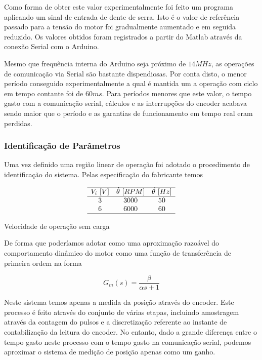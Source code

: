 \documentclass[a4paper,11pt]{article}
\begin{document}
Como forma de obter este valor experimentalmente foi feito um programa aplicando um sinal de entrada de dente de serra. Isto é o valor de referência passado para a tensão do motor foi gradualmente aumentado e em seguida reduzido. Os valores obtidos foram registrados a partir do Matlab através da conexão Serial com o Arduino.

Mesmo que frequência interna do Arduino seja próximo de $14 MHz$, as operações de comunicação via Serial são bastante dispendiosas. Por conta disto, o menor período conseguido experimentalmente a qual é mantida um a operação com ciclo em tempo contante foi de $60ms$. Para períodos menores que este valor, o tempo gasto com a comunicação serial, cálculos e as interrupções do encoder acabava sendo maior que o período e as garantias de funcionamento em tempo real eram perdidas.

\subsubsection{Identificação de Parâmetros}

Uma vez definido uma região linear de operação foi adotado o procedimento de identificação do sistema. Pelas especificação do fabricante temos

\begin{table}[H]
    $$
    \begin{array}{ccc}
         \hline
         V_i\ [V] & \dot{\theta}\ [RPM] & \dot{\theta}\ [Hz]\\
         \hline
         3 & 3000 & 50 \\
         6 & 6000 & 60 \\
         \hline
    \end{array}
    $$
    \caption{Velocidade de operação sem carga}
    \label{tab:dcmotor_speed}
\end{table}

De forma que poderíamos adotar como uma aproximação razoável do comportamento dinâmico do motor como uma função de transferência de primeira ordem na forma

\begin{equation}
    G_m(s) = \frac{\beta}{\alpha s + 1}
\end{equation}

Neste sistema temos apenas a medida da posição através do encoder. Este processo é feito através do conjunto de várias etapas, incluindo amostragem através da contagem do pulsos e a discretização referente ao instante de contabilização da leitura do encoder. No entanto, dado a grande diferença entre o tempo gasto neste processo com o tempo gasto na comunicação serial, podemos aproximar o sistema de medição de posição apenas como um ganho.
\end{document}
